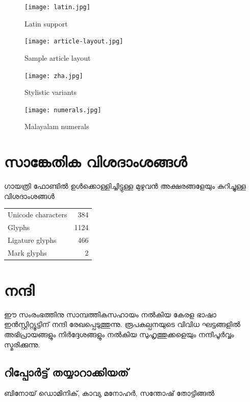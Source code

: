 \documentclass[a4paper, 12pt]{report}
\begin{document}
	\begin{figure}
		\begin{centering}
			\texttt{[image: latin.jpg]}
			\caption{Latin support}
			\label{latin}
		\end{centering}
	\end{figure}
	
	\begin{figure}
		\begin{centering}
			\texttt{[image: article-layout.jpg]}
			\caption{Sample article layout}
			\label{layout}
		\end{centering}
	\end{figure}

	\begin{figure}
		\begin{centering}
			\texttt{[image: zha.jpg]}
			\caption{Stylistic variants}
			\label{sample-zha}
		\end{centering}
	\end{figure}

	\begin{figure}
		\begin{centering}
			\texttt{[image: numerals.jpg]}
			\caption{Malayalam numerals}
			\label{numerals}
		\end{centering}
	\end{figure}
	
	\chapter*{സാങ്കേതിക വിശദാംശങ്ങള്‍}
	
	ഗായത്രി ഫോണ്ടില്‍ ഉള്‍ക്കൊള്ളിച്ചിട്ടുള്ള മുഴുവന്‍ അക്ഷരങ്ങളേയും കുറിച്ചുള്ള വിശദാംശങ്ങൾ 
	\\[1cm]

    \begin{tabular}[l]{|l|r|}
    \hline
  Unicode characters & 384 \\
Glyphs & 1124 \\
Ligature glyphs & 466 \\
Mark glyphs & 2 \\\hline
\end{tabular}

	
	
	\chapter*{നന്ദി}
	ഈ സംരംഭത്തിനു സാമ്പത്തികസഹായം നൽകിയ കേരള ഭാഷാ ഇൻസ്റ്റിറ്റ്യൂട്ടിന് നന്ദി രേഖപ്പെടുത്തുന്നു.
	രൂപകല്പനയുടെ വിവിധ ഘട്ടങ്ങളിൽ അഭിപ്രായങ്ങളും നിർദ്ദേശങ്ങളും നൽകിയ സുഹൃത്തുക്കളെയും നന്ദിപൂർവ്വം സ്മരിക്കുന്നു.
	
	\section*{റിപ്പോർട്ട് തയ്യാറാക്കിയത്}
	ബിനോയ് ഡൊമിനിക്, കാവ്യ മനോഹർ, സന്തോഷ് തോട്ടിങ്ങൽ
\end{document}
